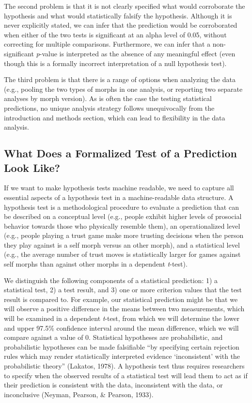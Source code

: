 \documentclass[english,doc,floatsintext]{apa6}
\begin{document}
The second problem is that it is not clearly specified what would corroborate the hypothesis and what would statistically falsify the hypothesis. Although it is never explicitly stated, we can infer that the prediction would be corroborated when either of the two tests is significant at an alpha level of 0.05, without correcting for multiple comparisons. Furthermore, we can infer that a non-significant \emph{p}-value is interpreted as the absence of any meaningful effect (even though this is a formally incorrect interpretation of a null hypothesis test).

The third problem is that there is a range of options when analyzing the data (e.g., pooling the two types of morphs in one analysis, or reporting two separate analyses by morph version). As is often the case the testing statistical predictions, no unique analysis strategy follows unequivocally from the introduction and methods section, which can lead to flexibility in the data analysis.

\hypertarget{what-does-a-formalized-test-of-a-prediction-look-like}{%
\subsection{What Does a Formalized Test of a Prediction Look Like?}\label{what-does-a-formalized-test-of-a-prediction-look-like}}

If we want to make hypothesis tests machine readable, we need to capture all essential aspects of a hypothesis test in a machine-readable data structure. A hypothesis test is a methodological procedure to evaluate a prediction that can be described on a conceptual level (e.g., people exhibit higher levels of prosocial behavior towards those who physically resemble them), an operationalized level (e.g., people playing a trust game make more trusting decisions when the person they play against is a self morph versus an other morph), and a statistical level (e.g., the average number of trust moves is statistically larger for games against self morphs than against other morphs in a dependent \emph{t}-test).

We distinguish the following components of a statistical prediction: 1) a statistical test, 2) a test result, and 3) one or more criterion values that the test result is compared to. For example, our statistical prediction might be that we will observe a positive difference in the means between two measurements, which will be examined in a dependent \emph{t}-test, from which we will determine the lower and upper 97.5\% confidence interval around the mean difference, which we will compare against a value of 0. Statistical hypotheses are probabilistic, and probabilistic hypotheses can be made falsifiable \enquote{by specifying certain rejection rules which may render statistically interpreted evidence \enquote{inconsistent} with the probabilistic theory} (Lakatos, 1978). A hypothesis test thus requires researchers to specify when the observed results of a statistical test will lead them to act as if their prediction is consistent with the data, inconsistent with the data, or inconclusive (Neyman, Pearson, \& Pearson, 1933).
\end{document}
